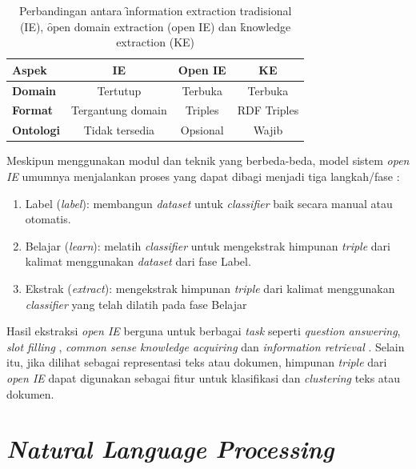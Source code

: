 \begin{table}
	\centering
	\caption{Perbandingan antara \f{information extraction} tradisional (IE), \f{open domain extraction} (open IE) dan \f{knowledge extraction} (KE)}
	\label{table_paradigm_comparison}
	\begin{tabular}{l c c c}
		\hline 
		\textbf{Aspek} & \textbf{IE} & \textbf{Open IE} & \textbf{KE} \\ 
		\hline 
		\textbf{Domain} & Tertutup & Terbuka & Terbuka \\ 
		\textbf{Format} & Tergantung domain & Triples & RDF Triples \\ 
		\textbf{Ontologi} & Tidak tersedia & Opsional & Wajib \\ 
		\hline 
	\end{tabular} 
\end{table}

Meskipun menggunakan modul dan teknik yang berbeda-beda, model sistem \textit{open IE} umumnya menjalankan proses yang dapat dibagi menjadi tiga langkah/fase \citep{etzioni2011open}:

\begin{enumerate}
	\item Label (\textit{label}): membangun \textit{dataset} untuk \textit{classifier} baik secara manual atau otomatis.
	\item Belajar (\textit{learn}): melatih \textit{classifier} untuk mengekstrak himpunan \textit{triple} dari kalimat menggunakan \textit{dataset} dari fase Label.
	\item Ekstrak (\textit{extract}): mengekstrak himpunan \textit{triple} dari kalimat menggunakan \textit{classifier} yang telah dilatih pada fase Belajar
\end{enumerate}

Hasil ekstraksi \textit{open IE} berguna untuk berbagai \textit{task} seperti \textit{question answering}, \textit{slot filling} \citep{etzioni2011open}, \textit{common sense knowledge acquiring} \citep{singh2002open} dan \textit{information retrieval} \citep{etzioni2011search}. Selain itu, jika dilihat sebagai representasi teks atau dokumen, himpunan \textit{triple} dari \textit{open IE} dapat digunakan sebagai fitur untuk klasifikasi dan \textit{clustering} teks atau dokumen.

\section{\textit{Natural Language Processing}}

